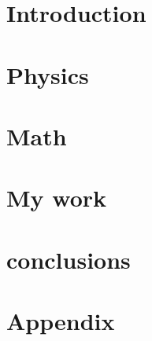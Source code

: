 


\maketitle

\chapter{Introduction}

\chapter{Physics}
	
	
	
	
\chapter{Math}

\chapter{My work}

\chapter{conclusions}

\chapter{Appendix}

\nocite{*}


